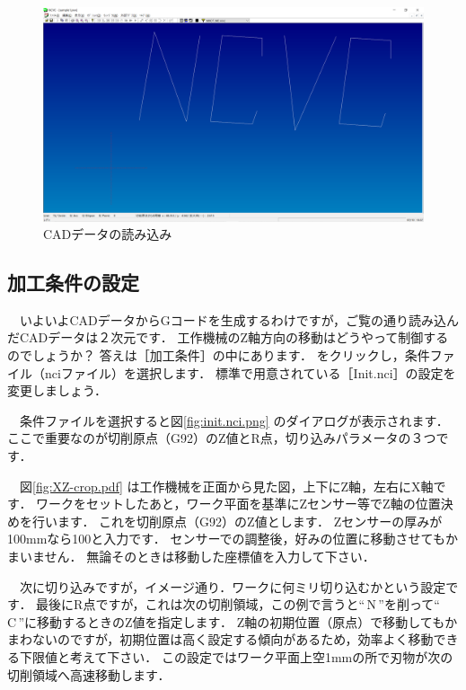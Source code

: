 \begin{figure}[H]
\centering
\includegraphics[scale=0.4]{No1/fig/NCVCread.png}
\caption{CADデータの読み込み}
\label{fig:NCVCread.png}
\end{figure}

\subsection{加工条件の設定}

　いよいよCADデータからGコードを生成するわけですが，ご覧の通り読み込んだCADデータは２次元です．
工作機械のZ軸方向の移動はどうやって制御するのでしょうか？
答えは［加工条件］の中にあります．
 をクリックし，条件ファイル（nciファイル）を選択します．
標準で用意されている［Init.nci］の設定を変更しましょう．

　条件ファイルを選択すると図\ref{fig:init.nci.png} のダイアログが表示されます．
ここで重要なのが切削原点（G92）のZ値とR点，切り込みパラメータの３つです．

　図\ref{fig:XZ-crop.pdf} は工作機械を正面から見た図，上下にZ軸，左右にX軸です．
ワークをセットしたあと，ワーク平面を基準にZセンサー等でZ軸の位置決めを行います．
これを切削原点（G92）のZ値とします．
Zセンサーの厚みが100mmなら100と入力です．
センサーでの調整後，好みの位置に移動させてもかまいません．
無論そのときは移動した座標値を入力して下さい．

　次に切り込みですが，イメージ通り．ワークに何ミリ切り込むかという設定です．
最後にR点ですが，これは次の切削領域，この例で言うと``\,N\,''を削って``\,C\,''に移動するときのZ値を指定します．
Z軸の初期位置（原点）で移動してもかまわないのですが，初期位置は高く設定する傾向があるため，効率よく移動できる下限値と考えて下さい．
この設定ではワーク平面上空1mmの所で刃物が次の切削領域へ高速移動します．

